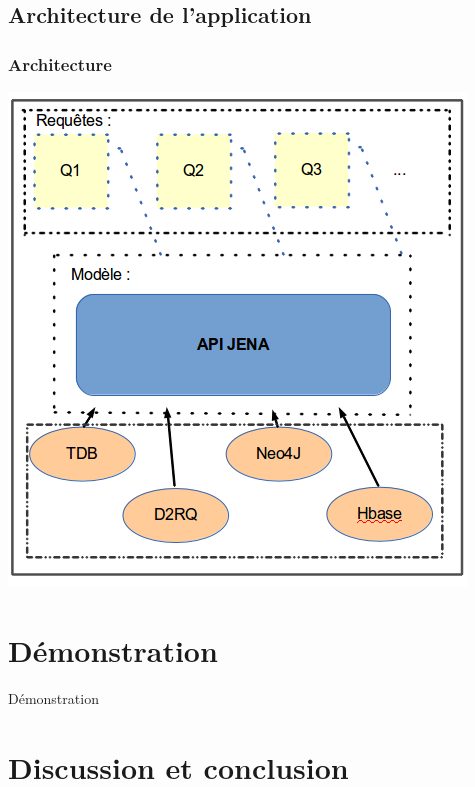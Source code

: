 \documentclass[12pt]{beamer}
\begin{document}
\subsection{Architecture de l'application}
\begin{frame}
\frametitle{Architecture}
\begin{center}
\includegraphics[scale=0.4]{archi_appli.png} 

\label{fig_appli}
\end{center}

\end{frame}
\section{Démonstration}

\begin{frame}

\begin{center}
\huge Démonstration

\end{center}
\end{frame}
\section{Discussion et conclusion}
\end{document}

